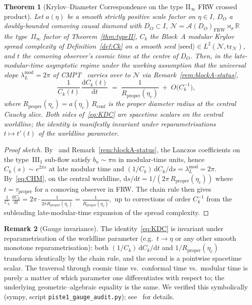 \documentclass[11pt]{article}
\newtheorem{theorem}{Theorem}
\theoremstyle{definition}
\newtheorem{remark}[theorem]{Remark}
\newcommand{\R}{\mathbb{R}}
\renewcommand{\AA}{\mathcal{A}}
\newcommand{\NN}{\mathcal{N}}
\newcommand{\FRW}{\mathrm{FRW}}
\newcommand{\Rprop}{R_{\mathrm{proper}}}
\newcommand{\Rconf}{R_{\mathrm{conf}}}
\begin{document}
\begin{theorem}[Krylov--Diameter Correspondence on the type II$_\infty$ FRW crossed product]\label{thm:KDC}
Let $a(\eta)$ be a smooth strictly positive scale factor on
$\eta\in I$, $D_O$ a doubly-bounded comoving causal diamond with
$\overline{D_O}\subset I$, $\NN = \AA(D_O)_\FRW\rtimes_\sigma\R$ the
type~II$_\infty$ factor of Theorem~\ref{thm:typeII}, $C_k$ the
Block~A modular Krylov spread complexity of Definition~\ref{def:Ck}
on a smooth seed $\lvert\mathrm{seed}\rangle\in L^2(\NN, \mathrm{tr}_\NN)$,
and $t$ the comoving observer's cosmic time at the centre of $D_O$.
Then, in the late-modular-time asymptotic regime under the working
assumption that the universal slope
$\lambda_L^{\mathrm{mod}} = 2\pi$ of CMPT~\cite{CMPT24} carries over
to $\NN$ via Remark~\ref{rem:blockA-status},
\begin{equation}\label{eq:KDC}
\boxed{\;\;
\frac{1}{C_k(t)}\,\frac{\mathrm{d}C_k(t)}{\mathrm{d}t}
\;=\; \frac{1}{\Rprop(\eta_c)}
\;+\; O\!\big(C_k^{-1}\big),
\;\;}
\end{equation}
where $\Rprop(\eta_c) = a(\eta_c)\,\Rconf$ is the proper diameter
radius at the central Cauchy slice. Both sides of~\eqref{eq:KDC} are
spacetime scalars on the central worldline; the identity is
manifestly invariant under reparametrisations
$t \mapsto t'(t)$ of the worldline parameter.
\end{theorem}

\begin{proof}[Proof sketch]
By~\cite[Eq.~(4.16)/(5.4)]{CMPT24} and Remark~\ref{rem:blockA-status},
the Lanczos coefficients on the type~III$_1$ sub-flow satisfy
$b_n \sim \pi n$ in modular-time units, hence
$C_k(s)\sim e^{2\pi s}$ at late modular time and
\((1/C_k)\,\mathrm{d}C_k/\mathrm{d}s = \lambda_L^{\mathrm{mod}}=2\pi.\)
By~\eqref{eq:CHM}, on the central worldline,
\(\mathrm{d}s/\mathrm{d}t = 1/(2\pi\,\Rprop(\eta_c))\) where
$t = \tau_{\mathrm{proper}}$ for a comoving observer in FRW. The
chain rule then gives
\(\frac{1}{C_k}\,\frac{\mathrm{d}C_k}{\mathrm{d}t} = 2\pi \cdot \frac{1}{2\pi\Rprop(\eta_c)} = \frac{1}{\Rprop(\eta_c)},\)
up to corrections of order $C_k^{-1}$ from the subleading
late-modular-time expansion of the spread complexity.
\end{proof}

\begin{remark}[Gauge invariance]\label{rem:gauge}
The identity~\eqref{eq:KDC} is invariant under reparametrisation of
the worldline parameter (e.g.\ $t\to\eta$ or any other smooth
monotone reparametrisation): both
$(1/C_k)\,\mathrm{d}C_k/\mathrm{d}t$ and $1/\Rprop(\eta_c)$
transform identically by the chain rule, and the second is a
pointwise spacetime scalar. The traversal through cosmic time vs.\
conformal time vs.\ modular time is purely a matter of which
parameter one differentiates with respect to; the underlying
geometric--algebraic equality is the same. We verified this
symbolically (sympy, script
\texttt{piste1\_gauge\_audit.py}); see~\cite{Remondiere2026} for
details.
\end{remark}
\end{document}
